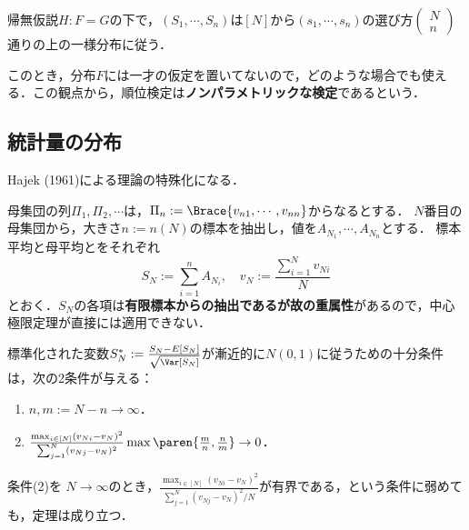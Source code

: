 \documentclass[uplatex,dvipdfmx]{jsreport}
\begin{document}
\begin{theorem}
    帰無仮説$H:F=G$の下で，$(S_1,\cdots,S_n)$は$[N]$から$(s_1,\cdots,s_n)$の選び方$\begin{pmatrix}N\\n\end{pmatrix}$通りの上の一様分布に従う．
\end{theorem}

\begin{remark}
    このとき，分布$F$には一才の仮定を置いてないので，どのような場合でも使える．この観点から，順位検定は\textbf{ノンパラメトリックな検定}であるという．
\end{remark}

\subsection{統計量の分布}

\begin{tcolorbox}[colframe=ForestGreen, colback=ForestGreen!10!white,breakable,colbacktitle=ForestGreen!40!white,coltitle=black,fonttitle=\bfseries\sffamily,
title=]
    Hajek (1961)による理論の特殊化になる．
\end{tcolorbox}

\begin{notation}
    母集団の列$\Pi_1,\Pi_2,\cdots$は，$\Pi_n:=\Brace{v_{n1},\cdots,v_{nn}}$からなるとする．
    $N$番目の母集団から，大きさ$n:=n(N)$の標本を抽出し，値を$A_{N_1},\cdots,A_{N_n}$とする．
    標本平均と母平均とをそれぞれ
    \[S_N:=\sum_{i=1}^nA_{N_i},\quad v_N:=\frac{\sum_{i=1}^Nv_{Ni}}{N}\]
    とおく．$S_N$の各項は\textbf{有限標本からの抽出であるが故の重属性}があるので，中心極限定理が直接には適用できない．
\end{notation}

\begin{theorem}
    標準化された変数$S^*_N:=\frac{S_N-E[S_N]}{\sqrt{\Var[S_N]}}$が漸近的に$N(0,1)$に従うための十分条件は，次の2条件が与える：
    \begin{enumerate}
        \item $n,m:=N-n\to\infty$．
        \item $\frac{\max_{i\in[N]}(v_{Ni}-v_{N})^2}{\sum_{j=1}^N(v_{Nj}-v_N)^2}\max\paren{\frac{m}{n},\frac{n}{m}}\to0$．
    \end{enumerate}
\end{theorem}

\begin{corollary}
    条件(2)を
    $N\to\infty$のとき，$\frac{\max_{i\in[N]}(v_{Ni}-v_{N})^2}{\sum_{j=1}^N(v_{Nj}-v_N)^2/N}$が有界である，という条件に弱めても，定理は成り立つ．
\end{corollary}
\end{document}
